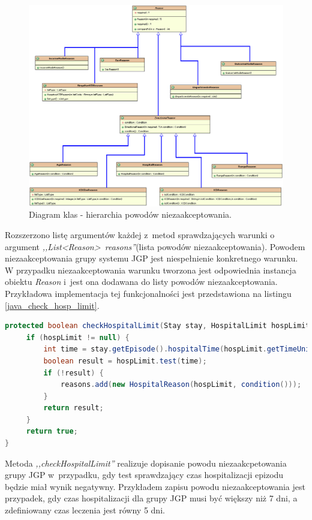 \begin{figure}[!ht]
\centering
\includegraphics[scale=0.4]{images/reason-classes2}
\caption[Diagram aktywności]{Diagram klas - hierarchia powodów niezaakceptowania.}
\label{img:diagram_class_reason}
\end{figure}

\newpage
Rozszerzono listę argumentów każdej z~metod sprawdzających warunki o argument \mbox{\textit{,,List<Reason> reasons''}}(lista powodów niezaakceptowania). Powodem niezaakceptowania grupy systemu JGP jest niespełnienie konkretnego warunku.
W przypadku niezaakceptowania warunku tworzona jest odpowiednia instancja obiektu \textit{Reason} i~jest ona  dodawana do listy powodów niezaakceptowania. Przykładowa implementacja tej funkcjonalności jest przedstawiona na listingu \ref{java_check_hosp_limit}.

\begin{lstlisting}[language=Java,caption={Metoda sprawdzająca warunek na czas hospitalizacji.},label=java_check_hosp_limit]
protected boolean checkHospitalLimit(Stay stay, HospitalLimit hospLimit, List<Reason> reasons) {
     if (hospLimit != null) {
         int time = stay.getEpisode().hospitalTime(hospLimit.getTimeUnit());
         boolean result = hospLimit.test(time);
         if (!result) {
             reasons.add(new HospitalReason(hospLimit, condition()));
         }
         return result;
     }
     return true;
}
\end{lstlisting}

Metoda \textit{,,checkHospitalLimit''} realizuje dopisanie powodu niezaakcpetowania grupy JGP w~przypadku, gdy test sprawdzający czas hospitalizacji epizodu będzie miał wynik negatywny. Przykładem zapisu powodu niezaakceptowania jest przypadek, gdy czas hospitalizacji dla grupy JGP musi być większy niż 7 dni, a zdefiniowany czas leczenia jest równy 5 dni.

